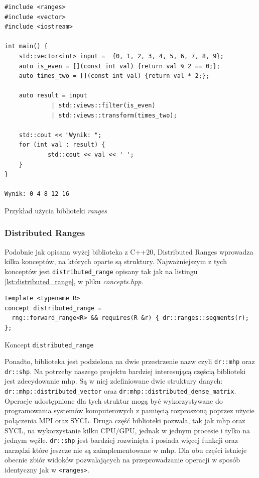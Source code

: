 \documentclass[a4paper,12pt]{book} %
\begin{document}
\begin{lstfloat}[H]
\lstset{language=C++}
\begin{lstlisting}[frame=single]
#include <ranges>
#include <vector>
#include <iostream>

int main() {
	std::vector<int> input =  {0, 1, 2, 3, 4, 5, 6, 7, 8, 9};
    auto is_even = [](const int val) {return val % 2 == 0;};
    auto times_two = [](const int val) {return val * 2;};

    auto result = input
             | std::views::filter(is_even)
             | std::views::transform(times_two);
    
    std::cout << "Wynik: ";
    for (int val : result) {
    		std::cout << val << ' ';
  	}
}

Wynik: 0 4 8 12 16
\end{lstlisting}
\caption{Przykład użycia biblioteki \emph{ranges}}\label{lst:ranges_przyklad}
\end{lstfloat}

\subsubsection{Distributed Ranges}
Podobnie jak opisana wyżej biblioteka z C++20, Distributed Ranges wprowadza kilka konceptów, na których oparte są struktury. Najważniejszym z tych konceptów jest \texttt{distributed\_range} opisany tak jak na listingu \ref{lst:distributed_range}, w pliku \emph{concepts.hpp}.

\begin{lstfloat}[H]
\lstset{language=C++}
\begin{lstlisting}[frame=single]
template <typename R>
concept distributed_range =
  rng::forward_range<R> && requires(R &r) { dr::ranges::segments(r); };
\end{lstlisting}
\caption{Koncept \texttt{distributed\_range}}
\label{lst:distributed_range}
\end{lstfloat}

Ponadto, biblioteka jest podzielona na dwie przestrzenie nazw czyli \texttt{dr::mhp} oraz \texttt{dr::shp}. Na potrzeby naszego projektu bardziej interesującą częścią biblioteki jest zdecydowanie mhp. Są w niej zdefiniowane dwie struktury danych: \texttt{dr::mhp::distributed\_vector} oraz \texttt{dr:mhp::distributed\_dense\_matrix}. Operacje udostępnione dla tych struktur mogą być wykorzystywane do programowania systemów komputerowych z pamięcią rozproszoną poprzez użycie połączenia MPI oraz SYCL. Druga część biblioteki pozwala, tak jak mhp oraz SYCL, na wykorzystanie kilku CPU/GPU, jednak w jednym procesie i tylko na jednym węźle. \texttt{dr::shp} jest bardziej rozwinięta i posiada więcej funkcji oraz narzędzi które jeszcze nie są zaimplementowane w mhp. Dla obu części istnieje obecnie zbiór widoków pozwalających na przeprowadzanie operacji w sposób identyczny jak w \texttt{<ranges>}.
\end{document}
